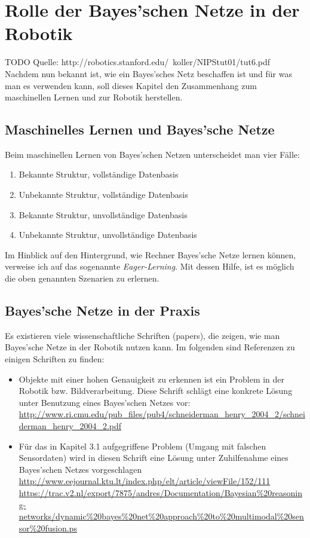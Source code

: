 \chapter{Rolle der Bayes'schen Netze in der Robotik}
TODO Quelle: http://robotics.stanford.edu/~koller/NIPStut01/tut6.pdf
Nachdem nun bekannt ist, wie ein Bayes'sches Netz beschaffen ist und für was man es verwenden kann, soll dieses Kapitel den Zusammenhang zum maschinellen Lernen und zur Robotik herstellen.
\section{Maschinelles Lernen und Bayes'sche Netze}
Beim maschinellen Lernen von Bayes'schen Netzen unterscheidet man vier Fälle:
\begin{enumerate}

\item Bekannte Struktur, vollständige Datenbasis
\item Unbekannte Struktur, vollständige Datenbasis
\item Bekannte Struktur, unvollständige Datenbasis 
\item Unbekannte Struktur, unvollständige Datenbasis
\end{enumerate}

Im Hinblick auf den Hintergrund, wie Rechner Bayes'sche Netze lernen können, verweise ich auf das sogenannte \textit{Eager-Lerning}. Mit dessen Hilfe, ist es möglich die oben genannten Szenarien zu erlernen. 

\section{Bayes'sche Netze in der Praxis}
Es existieren viele wissenschaftliche Schriften (papers), die zeigen, wie man Bayes'sche Netze in der Robotik nutzen kann. Im folgenden sind Referenzen zu einigen Schriften zu finden:
\begin{itemize}
\item Objekte mit einer hohen Genauigkeit zu erkennen ist ein Problem in der Robotik bzw. Bildverarbeitung. Diese Schrift schlägt eine konkrete Lösung unter Benutzung eines Bayes'schen Netzes vor: \url{http://www.ri.cmu.edu/pub_files/pub4/schneiderman_henry_2004_2/schneiderman_henry_2004_2.pdf}
\item Für das in Kapitel 3.1 aufgegriffene Problem (Umgang mit falschen Sensordaten) wird in diesen Schrift eine Lösung unter Zuhilfenahme eines Bayes'schen Netzes vorgeschlagen \subitem \url{http://www.eejournal.ktu.lt/index.php/elt/article/viewFile/152/111} 
\subitem \url{https://trac.v2.nl/export/7875/andres/Documentation/Bayesian%20reasoning-networks/dynamic%20bayes%20net%20approach%20to%20multimodal%20sensor%20fusion.ps}
\end{itemize}






